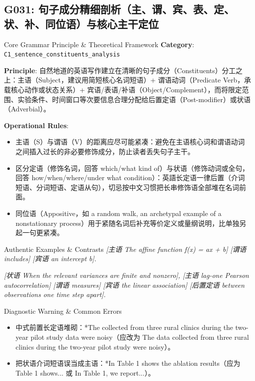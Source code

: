 \subsection{G031: 句子成分精细剖析（主、谓、宾、表、定、状、补、同位语）与核心主干定位}\label{sec:rule:G031}
\begin{ConceptBox}{Core Grammar Principle \& Theoretical Framework}
\textbf{Category}: \texttt{C1\_sentence\_constituents\_analysis}\par\vspace{3pt}
\textbf{Principle}: 自然地道的英语写作建立在清晰的句子成分（Constituents）分工之上：主语（Subject，建议用简短核心名词短语）+ 谓语动词（Predicate Verb，承载核心动作或状态关系）+ 宾语/表语/补语（Object/Complement），而将限定范围、实验条件、时间窗口等次要信息合理分配给后置定语（Post-modifier）或状语（Adverbial）。\par\vspace{4pt}
\textbf{Operational Rules}:
\begin{itemize}[leftmargin=1.5em, itemsep=1pt]
  \item 主语（S）与谓语（V）的距离应尽可能紧凑：避免在主语核心词和谓语动词之间插入过长的非必要修饰成分，防止读者丢失句子主干。
  \item 区分定语（修饰名词，回答 which/what kind of）与状语（修饰动词或全句，回答 how/when/where/under what condition）：英語长定语一律后置（介词短语、分词短语、定语从句），切忌按中文习惯把长串修饰语全部堆在名词前面。
  \item 同位语（Appositive，如 a random walk, an archetypal example of a nonstationary process）用于紧随名词后补充等价定义或量纲说明，比单独另起一句更紧凑。
\end{itemize}
\end{ConceptBox}
\begin{ExampleBox}{Authentic Examples \& Contrasts}
\textit{[主语 The affine function f(x) = ax + b] [谓语 includes] [宾语 an intercept b].}\par\vspace{2pt}
\textit{[状语 When the relevant variances are finite and nonzero], [主语 lag-one Pearson autocorrelation] [谓语 measures] [宾语 the linear association] [后置定语 between observations one time step apart].}\par\vspace{2pt}
\end{ExampleBox}
\begin{TipBox}{Diagnostic Warning \& Common Errors}
\begin{itemize}[leftmargin=1.5em, itemsep=1pt]
  \item 中式前置长定语堆砌：*The collected from three rural clinics during the two-year pilot study data were noisy（应改为 The data collected from three rural clinics during the two-year pilot study were noisy）。
  \item 把状语介词短语误当成主语：*In Table 1 shows the ablation results（应为 Table 1 shows... 或 In Table 1, we report...）。
\end{itemize}
\end{TipBox}
\vspace{6pt}
